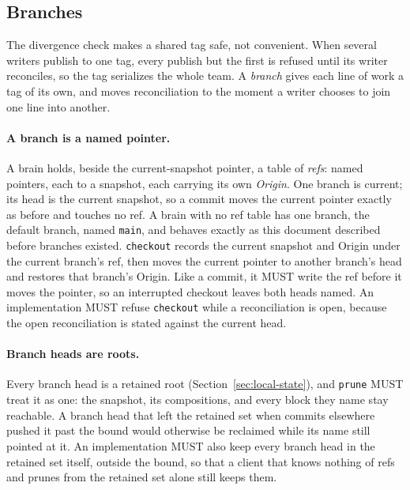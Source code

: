 \documentclass[11pt,a4paper]{article}
\begin{document}
\subsection{Branches}
\label{sec:branches}

The divergence check makes a shared tag safe, not convenient. When several
writers publish to one tag, every publish but the first is refused until its
writer reconciles, so the tag serializes the whole team. A \emph{branch} gives
each line of work a tag of its own, and moves reconciliation to the moment a
writer chooses to join one line into another.

\paragraph{A branch is a named pointer.}
A brain holds, beside the current-snapshot pointer, a table of \emph{refs}:
named pointers, each to a snapshot, each carrying its own \emph{Origin}. One
branch is current; its head is the current snapshot, so a commit moves the
current pointer exactly as before and touches no ref. A brain with no ref
table has one branch, the default branch, named \texttt{main}, and behaves
exactly as this document described before branches existed.
\texttt{checkout} records the current snapshot and Origin under the current
branch's ref, then moves the current pointer to another branch's head and
restores that branch's Origin. Like a commit, it MUST write the ref before it
moves the pointer, so an interrupted checkout leaves both heads named. An
implementation MUST refuse \texttt{checkout} while a reconciliation is open,
because the open reconciliation is stated against the current head.

\paragraph{Branch heads are roots.}
Every branch head is a retained root (Section~\ref{sec:local-state}), and
\texttt{prune} MUST treat it as one: the snapshot, its compositions, and every
block they name stay reachable. A branch head that left the retained set when
commits elsewhere pushed it past the bound would otherwise be reclaimed while
its name still pointed at it. An implementation MUST also keep every branch
head in the retained set itself, outside the bound, so that a client that
knows nothing of refs and prunes from the retained set alone still keeps them.
\end{document}
